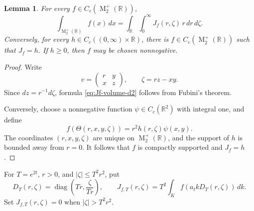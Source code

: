 \documentclass[reqno,11pt]{amsart}
\newtheorem{lem}[lem]{Lemma}
\theoremstyle{definition}
\theoremstyle{remark}
\numberwithin{equation}{section}
\newcommand{\M}{\operatorname{M}}
\begin{document}
\begin{lem}
\label{lem:Jf-basic-d2}
For every $f\in C_c(\M_2^+(\mathbb R))$,
\begin{equation}\label{eq:Jf-volume-d2}
\int_{\M_2^+(\mathbb R)}f(x)\,dx
=
\int_{\mathbb R}\int_0^\infty
J_f(r,\zeta)\,r\,dr\,d\zeta.
\end{equation}
Conversely, for every $h\in C_c((0,\infty)\times\mathbb R)$, there is
$f\in C_c(\M_2^+(\mathbb R))$ such that $J_f=h$. If $h\ge0$, then $f$
may be chosen nonnegative.
\end{lem}

\begin{proof}
Write
$$
v=
\begin{pmatrix}
r&y\\
x&z
\end{pmatrix},
\qquad
\zeta=rz-xy.
$$
Since $dz=r^{-1}d\zeta$, formula \eqref{eq:Jf-volume-d2} follows from
Fubini's theorem.

Conversely, choose a nonnegative function
$\psi\in C_c(\mathbb R^2)$ with integral one, and define
$$
f(\Theta(r,x,y,\zeta))
=
r^2h(r,\zeta)\psi(x,y).
$$
The coordinates $(r,x,y,\zeta)$ are unique on
$\M_2^+(\mathbb R)$, and the support of $h$ is bounded away from $r=0$.
It follows that $f$ is compactly supported and $J_f=h$.
\end{proof}

For $T=e^{2t}$, $r>0$, and $|\zeta|\le T^2r^2$, put
$$
D_T(r,\zeta)
=
\operatorname{diag}\left(Tr,\frac{\zeta}{Tr}\right),
\qquad
J_{f,T}(r,\zeta)
=
T^2\int_Kf(a_tkD_T(r,\zeta))\,dk.
$$
Set $J_{f,T}(r,\zeta)=0$ when $|\zeta|>T^2r^2$.
\end{document}
